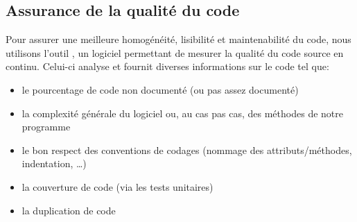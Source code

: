 \subsection{Assurance de la qualité du code}
Pour assurer une meilleure homogénéité, lisibilité et maintenabilité du code, nous utilisons l’outil , un logiciel permettant de mesurer la qualité du code source  en continu. 
Celui-ci analyse et fournit diverses informations sur le code tel que:
\begin{itemize}
	\item le pourcentage de code non documenté (ou pas assez documenté)
	\item la complexité générale du logiciel ou, au cas pas cas, des méthodes de notre programme
	\item le bon respect des conventions de codages (nommage des attributs/méthodes, indentation, …)
	\item la couverture de code (via les tests unitaires) 
	\item la duplication de code
\end{itemize}
